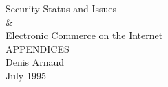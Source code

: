 \documentclass[10pt,a4paper,twoside]{report}
\begin{document}

\begin{titlepage}
  \begin{center}
    {\Huge Security Status and Issues\\}
    \vspace{1cm}
    {\Huge \&\\}
    \vspace{1cm}
    {\Huge Electronic Commerce on the Internet\\}
    \vspace{2cm}
    {\Huge APPENDICES\\}
    \vspace{3cm}
    {\Large Denis Arnaud\\}
    \vspace{1cm}
    {\large July 1995}
  \end{center}
\end{titlepage}         

\begin{htmlonly}
  \centerline{}
\end{htmlonly}

\normalsize
\begin{latexonly}
  \tableofcontents
\end{latexonly}










\end{document}
